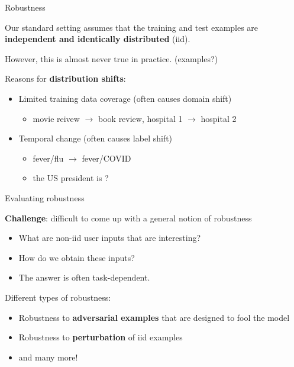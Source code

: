 \documentclass[usenames,dvipsnames,notes,11pt,aspectratio=169,hyperref={colorlinks=true, linkcolor=blue}]{beamer}
\begin{document}
\begin{frame}
    {Robustness}

    Our standard setting assumes that the training and test examples are \textbf{independent and identically distributed} (iid).

    However, this is almost never true in practice. (examples?)
    \pause

    Reasons for {\bf distribution shifts}:\\
    \begin{itemize}
        \item Limited training data coverage (often causes domain shift)
            \begin{itemize}
                \item movie reivew $\rightarrow$ book review, hospital 1 $\rightarrow$ hospital 2
            \end{itemize}
        \item Temporal change (often causes label shift)
            \begin{itemize}
        \item fever/flu  $\rightarrow$ fever/COVID
        \item the US president is ?
            \end{itemize}
    \end{itemize}
\end{frame}

\begin{frame}
    {Evaluating robustness}

    \textbf{Challenge}: difficult to come up with a general notion of robustness\\
    \begin{itemize}
        \item What are non-iid user inputs that are interesting? 
        \item How do we obtain these inputs?
        \item The answer is often task-dependent.
    \end{itemize}
    \pause

    Different types of robustness:\\
    \begin{itemize}
        \item Robustness to \textbf{adversarial examples} that are designed to fool the model
        \item Robustness to \textbf{perturbation} of iid examples
        \item and many more!
    \end{itemize}
\end{frame}
\end{document}
